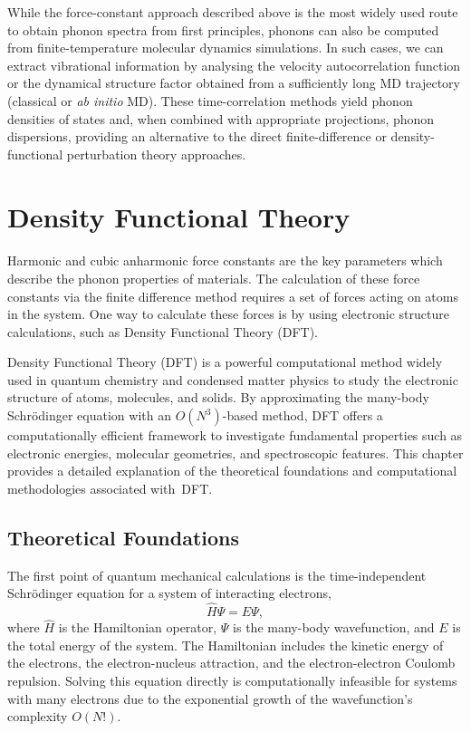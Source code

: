 While the force-constant approach described above is the most widely used route to obtain phonon spectra from first principles, phonons can also be computed from finite-temperature molecular dynamics simulations. 
In such cases, we can extract vibrational information by analysing the velocity autocorrelation function or the dynamical structure factor obtained from a sufficiently long MD trajectory (classical or \textit{ab initio} MD). 
These time-correlation methods yield phonon densities of states and, when combined with appropriate projections, phonon dispersions, providing an alternative to the direct finite-difference or density-functional perturbation theory approaches.


\section{Density Functional Theory} \label{sec:2.2}
\paragraph{}
Harmonic and cubic anharmonic force constants are the key parameters which describe the phonon properties of materials.
The calculation of these force constants via the finite difference method requires a set of forces acting on atoms in the system.
One way to calculate these forces is by using electronic structure calculations, such as Density Functional Theory (DFT).

Density Functional Theory (DFT) is a powerful computational method widely used in quantum chemistry and condensed matter physics to study the electronic structure of atoms, molecules, and solids.
By approximating the many-body Schrödinger equation with an $O(N^{3})$-based method, DFT offers a computationally efficient framework to investigate fundamental properties such as electronic energies, molecular geometries, and spectroscopic features.
This chapter provides a detailed explanation of the theoretical foundations and computational methodologies associated with~DFT.

\subsection{Theoretical Foundations}  \label{sec:2.2.1}
The first point of quantum mechanical calculations is the time-independent Schr\"{o}dinger equation for a system of interacting electrons,
\[
    \hat{H} \Psi = E \Psi,
\]
where $\hat{H}$ is the Hamiltonian operator, $\Psi$ is the many-body wavefunction, and $E$ is the total energy of the system.
The Hamiltonian includes the kinetic energy of the electrons, the electron-nucleus attraction, and the electron-electron Coulomb repulsion.
Solving this equation directly is computationally infeasible for systems with many electrons due to the exponential growth of the wavefunction's complexity $O(N!)$.

